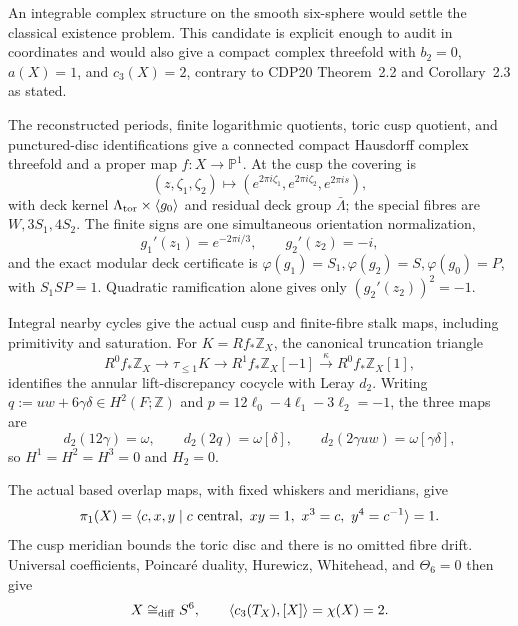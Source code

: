 {\ResultSmall
An integrable complex structure on the smooth six-sphere would settle the
classical existence problem.  This candidate is explicit enough to audit in
coordinates and would also give a compact complex threefold with
\(b_2=0\), \(a(X)=1\), and \(c_3(X)=2\), contrary to CDP20 Theorem~2.2 and
Corollary~2.3 as stated.
}

{\ResultSmall
The reconstructed periods, finite logarithmic quotients, toric cusp quotient,
and punctured-disc identifications give a connected compact Hausdorff complex
threefold and a proper map \(f:X\to\mathbb P^1\).  At the cusp the covering is
\[
 (z,\zeta_1,\zeta_2)\longmapsto
 (e^{2\pi i\zeta_1},e^{2\pi i\zeta_2},e^{2\pi i s}),
\]
with deck kernel \(\Lambda_{\rm tor}\times\langle g_0\rangle\) and residual
deck group \(\bar\Lambda\); the special fibres are \(W,3S_1,4S_2\).
The finite signs are one simultaneous orientation normalization,
\[
 g_1'(z_1)=e^{-2\pi i/3},\qquad g_2'(z_2)=-i,
\]
and the exact modular deck certificate is
\(\varphi(g_1)=S_1,\varphi(g_2)=S,\varphi(g_0)=P\), with
\(S_1SP=1\).  Quadratic ramification alone gives only
\((g_2'(z_2))^2=-1\).
}

{\ResultSmall
Integral nearby cycles give the actual cusp and finite-fibre stalk maps,
including primitivity and saturation.  For \(K=Rf_*\mathbb Z_X\), the
canonical truncation triangle
\[
 R^0f_*\mathbb Z_X\longrightarrow\tau_{\le1}K
 \longrightarrow R^1f_*\mathbb Z_X[-1]
 \xrightarrow{\kappa}R^0f_*\mathbb Z_X[1],
\]
identifies the annular lift-discrepancy cocycle with Leray \(d_2\).  Writing
\(q:=uw+6\gamma\delta\in H^2(F;\mathbb Z)\) and
\(p=12\ell_0-4\ell_1-3\ell_2=-1\), the three maps are
\[
 d_2(12\gamma)=\omega,\qquad
 d_2(2q)=\omega[\delta],\qquad
 d_2(2\gamma uw)=\omega[\gamma\delta],
\]
so \(H^1=H^2=H^3=0\) and \(H_2=0\).
}

{\ResultSmall
The actual based overlap maps, with fixed whiskers and meridians, give
\[
 \pi_1(X)=\langle c,x,y\mid c\ {\rm central},\ xy=1,\ x^3=c,\ y^4=c^{-1}\rangle=1.
\]
The cusp meridian bounds the toric disc and there is no omitted fibre drift.
Universal coefficients, Poincar\'e duality, Hurewicz, Whitehead, and
\(\Theta_6=0\) then give
\[
 X\cong_{\rm diff}S^6,
 \qquad \langle c_3(T_X),[X]\rangle=\chi(X)=2.
\]
}

